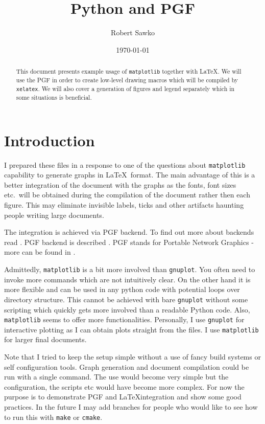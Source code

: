 \documentclass[a4paper,12pt]{article}
\date{\today}
\author{Robert Sawko}
\affil{Department of Engineering Computing, Cranfield University}
\title{Python and PGF}
\begin{document}
\maketitle

\begin{abstract}

  This document presents example usage of \texttt{matplotlib} together with
  \LaTeX. We will use the PGF in order to create low-level drawing macros which
  will be compiled by \texttt{xelatex}. We will also cover a generation of
  figures and legend separately which in some situations is beneficial.

\end{abstract}

\section{Introduction}
I prepared these files in a response to one of the questions about
\texttt{matplotlib} capability to generate graphs in \LaTeX\ format. The main
advantage of this is a better integration of the document with the graphs as the
fonts, font sizes etc.\ will be obtained during the compilation of the document
rather then each figure. This may eliminate invisible labels, ticks and other
artifacts haunting people writing large documents.

The integration is achieved via PGF backend. To find out more about backends
read \cite{backend}. PGF backend is described \cite{pgf}. PGF stands for Portable
Network Graphics - more can be found in \cite{pgfwiki}.

Admittedly, \texttt{matplotlib} is a bit more involved than \texttt{gnuplot}.
You often need to invoke more commands which are not intuitively clear. On the
other hand it is more flexible and can be used in any python code with potential
loops over directory structure. This cannot be achieved with bare
\texttt{gnuplot} without some scripting which quickly gets more involved than a
readable Python code. Also, \texttt{matplotlib} seems to offer more
functionalities. Personally, I use \texttt{gnuplot} for interactive plotting as
I can obtain plots straight from the files. I use \texttt{matplotlib} for larger
final documents.

Note that I tried to keep the setup simple without a use of fancy build systems
or self configuration tools. Graph generation and document compilation could be
run with a single command. The use would become very simple but the
configuration, the scripts etc would have become more complex. For now the
purpose is to demonstrate PGF and \LaTeX integration and show some good
practices. In the future I may add branches for people who would like to see how
to run this with \texttt{make} or \texttt{cmake}.
\end{document}
